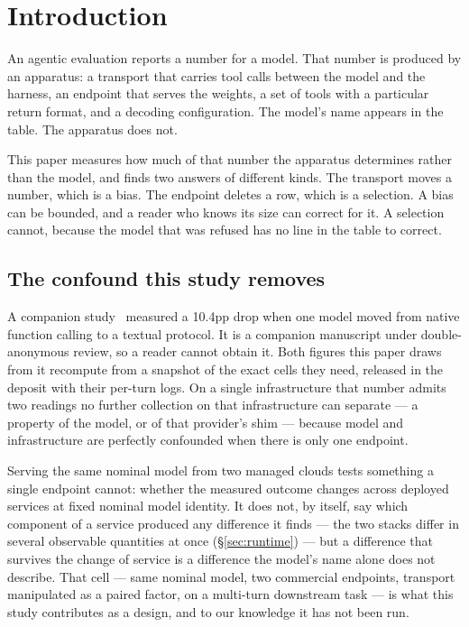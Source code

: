 \section{Introduction}
\label{sec:intro}

An agentic evaluation reports a number for a model. That number is produced by an apparatus:
a transport that carries tool calls between the model and the harness, an endpoint that serves
the weights, a set of tools with a particular return format, and a decoding configuration. The
model's name appears in the table. The apparatus does not.

This paper measures how much of that number the apparatus determines rather than the model, and finds
two answers of different kinds. The transport moves a number, which is a
bias. The endpoint deletes a row, which is a selection. A bias can be bounded, and a reader who knows
its size can correct for it. A selection cannot, because the model that was
refused has no line in the table to correct.

\subsection{The confound this study removes}

A companion study~\citep{companion2026baseline} measured a 10.4pp drop when one model moved from native
function calling to a textual protocol. It is a companion manuscript
under double-anonymous review, so a reader cannot obtain it. Both figures this paper draws from it
recompute from a snapshot of the exact cells they need, released in the deposit with their per-turn logs. On a single infrastructure that number admits two readings no
further collection on that infrastructure can separate --- a property of the model, or of that
provider's shim --- because model and infrastructure are perfectly confounded when there is only one
endpoint.

Serving the same nominal model from two managed clouds tests something a single endpoint cannot: whether
the measured outcome changes across deployed services at fixed nominal model identity. It does not, by
itself, say which component of a service produced any difference it finds --- the two stacks differ in
several observable quantities at once (\S\ref{sec:runtime}) --- but a difference that survives the change
of service is a difference the model's name alone does not describe. That cell --- same nominal model, two
commercial endpoints, transport manipulated as a paired factor, on a multi-turn downstream task --- is what
this study contributes as a design, and to our knowledge it has not been run.

